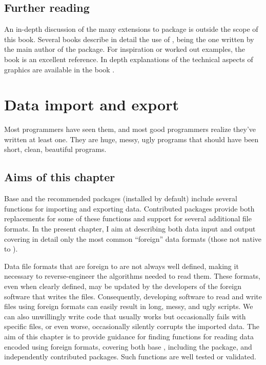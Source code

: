 \documentclass[krantz2]{krantz}\usepackage{knitr}
\begin{document}
\section{Further reading}
An in-depth discussion of the many extensions to package  is outside the scope of this book. Several books describe in detail the use of , being  \autocite{Wickham2016} the one written by the main author of the package. For inspiration or worked out examples, the book  \autocite{Chang2018} is an excellent reference. In depth explanations of the technical aspects of \Rlang graphics are available in the book  \autocite{Murrell2019}.









\chapter{Data import and export}\label{chap:R:data:io}\label{sec:data:io}

\begin{VF}
Most programmers have seen them, and most good programmers realize they've written at least one. They are huge, messy, ugly programs that should have been short, clean, beautiful programs.

\end{VF}



\section{Aims of this chapter}

Base \Rlang and the recommended packages (installed by default) include several functions for importing and exporting data. Contributed packages provide both replacements for some of these functions and support for several additional file formats. In the present chapter, I aim at describing both data input and output covering in detail only the most common ``foreign'' data formats (those not native to \Rlang).

Data file formats that are foreign to \Rlang are not always well defined, making it necessary to reverse-engineer the algorithms needed to read them. These formats, even when clearly defined, may be updated by the developers of the foreign software that writes the files. Consequently, developing software to read and write files using foreign formats can easily result in long, messy, and ugly \Rlang scripts. We can also unwillingly write code that usually works but occasionally fails with specific files, or even worse, occasionally silently corrupts the imported data. The aim of this chapter is to provide guidance for finding functions for reading data encoded using foreign formats, covering both base \Rlang, including the  package, and independently contributed packages. Such functions are well tested or validated.
\end{document}
